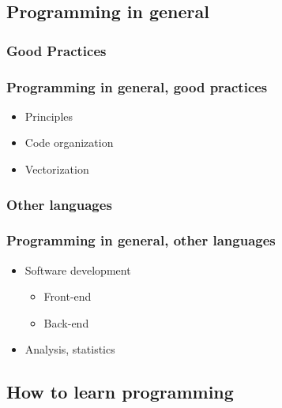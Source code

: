 \subsection{Programming in general}

\subsubsection{Good Practices}

\begin{frame}\frametitle{Programming in general, good practices}

   \begin{itemize}
      \item Principles
      \item Code organization
      \item Vectorization
   \end{itemize}

\end{frame}


\subsubsection{Other languages}

\begin{frame}\frametitle{Programming in general, other languages}

   \begin{itemize}
      \item Software development
      \begin{itemize}
         \item Front-end
         \item Back-end
      \end{itemize}
      \item Analysis, statistics
   \end{itemize}

\end{frame}

\subsection{How to learn programming}

